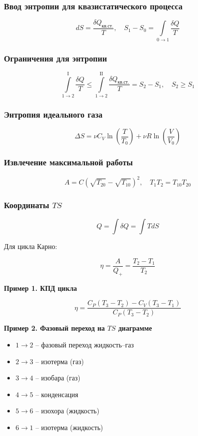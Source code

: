 \documentclass[12pt, a4paper]{article}
\begin{document}
\subsubsection*{Ввод энтропии для квазистатического процесса}

\[
dS = \frac{\delta Q_{\text{кв.ст.}}}{T}, \quad S_1 - S_0 = \int\limits_{0 \rightarrow 1} \frac{\delta Q}{T}
\]

\subsubsection*{Ограничения для энтропии}

\[
\int\limits_{1\rightarrow2}^{\mathrm{I}} \frac{\delta Q}{T} \le \int\limits_{1\rightarrow2}^{\mathrm{II}} \frac{\delta Q_{\text{кв.ст.}}}{T} = S_2 - S_1, \quad S_2 \ge S_1
\]

\subsubsection*{Энтропия идеального газа}

\[
\Delta S = \nu C_V \ln\left(\frac{T}{T_0}\right) + \nu R \ln\left(\frac{V}{V_0}\right)
\]

\subsubsection*{Извлечение максимальной работы}

\[
A = C \left(\sqrt{T_{20}} - \sqrt{T_{10}}\right)^2, \quad T_1 T_2 = T_{10} T_{20}
\]

\subsubsection*{Координаты $TS$}

\[
Q = \int \delta Q = \int T dS
\]

Для цикла Карно:

\[
\eta = \frac{A}{Q_+} = \frac{T_2 - T_1}{T_2}
\]

\textbf{Пример 1. КПД цикла}

\[
\eta = \frac{C_P (T_3 - T_2) - C_V (T_3 - T_1)}{C_P (T_3 - T_2)}
\]

\textbf{Пример 2. Фазовый переход на $TS$ диаграмме}

\begin{itemize}
\item $1 \rightarrow 2$ – фазовый переход жидкость–газ
\item $2 \rightarrow 3$ – изотерма (газ)
\item $3 \rightarrow 4$ – изобара (газ)
\item $4 \rightarrow 5$ – конденсация
\item $5 \rightarrow 6$ – изохора (жидкость)
\item $6 \rightarrow 1$ – изотерма (жидкость)
\end{itemize}
\end{document}
